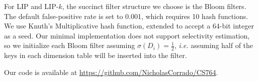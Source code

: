 For LIP and LIP-$k$, the succinct filter structure we choose is the Bloom filters. 
The default false-positive rate is set to 0.001, which requires 10 hash functions.
We use Knuth's Multiplicative hash function, extended to accept a 64-bit integer as a seed. 
Our minimal implementation does not support selectivity estimation, 
so we initialize each Bloom filter assuming $\sigma(D_i) = \frac{1}{2}$, 
{\it i.e.} assuming half of the keys in each dimension table will be inserted into the filter.

Our code is available at \url{https://github.com/NicholasCorrado/CS764}.


